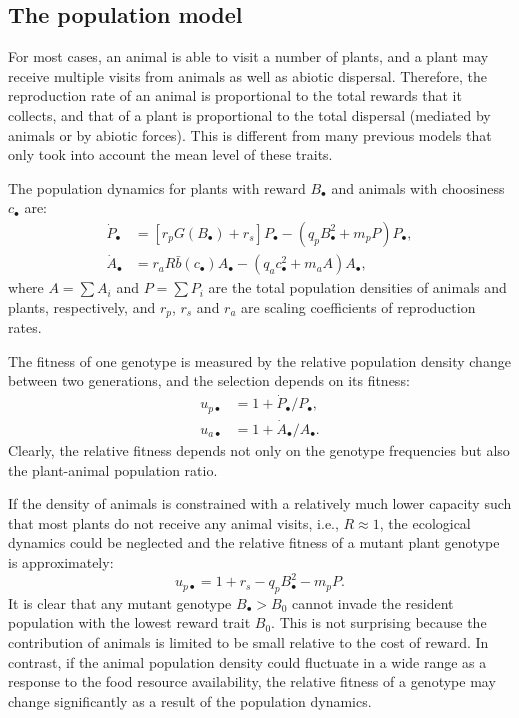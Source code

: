 \documentclass[12pt]{article}
\begin{document}
\subsection*{The population model}

For most cases, an animal is able to visit a number of plants, and a plant may receive multiple visits from animals as well as abiotic dispersal. Therefore, the reproduction rate of an animal is proportional to the total rewards that it collects, and that of a plant is proportional to the total dispersal (mediated by animals or by abiotic forces). This is different from many previous models that only took into account the mean level of these traits.

The population dynamics for plants with reward $B_\bullet$ and animals with choosiness $c_\bullet$ are:
\begin{subequations}
\begin{align}
\label{eq:PlantDensity}
\dot{P}_\bullet &= \left[r_p G(B_\bullet)+r_s \right] P_\bullet - (q_p B^2_\bullet + m_p P) P_\bullet , \\
\label{eq:AnimalDensity}
\dot{A}_\bullet&=r_a R \bar{b}(c_\bullet) A_\bullet- (q_a c^2_\bullet + m_a A) A_\bullet  , 
\end{align}
\end{subequations}
where $A=\sum{A_i}$ and $P=\sum{P_i}$ are the total population densities of animals and plants, respectively, and $r_p$, $r_s$ and $r_a$ are scaling coefficients of reproduction rates. 

The fitness of one genotype is measured by the relative population density change between two generations, and the selection depends on its fitness:
\begin{align*}
u_{p\bullet} &= 1+ \dot{P}_\bullet / P_\bullet, \\
u_{a\bullet} &= 1+ \dot{A}_\bullet / A_\bullet.
\label{eq:fitness}
\end{align*}
Clearly, the relative fitness depends not only on the genotype frequencies but also the plant-animal population ratio.

If the density of animals is constrained with a relatively much lower capacity such that most plants do not receive any animal visits, i.e., $R \approx 1$, the ecological dynamics could be neglected and the relative fitness of a mutant plant genotype is approximately:  
\begin{equation*}
u_{p\bullet}=1+ r_s - q_p B^2_\bullet - m_p P.
\end{equation*}
It is clear that any mutant genotype $B_\bullet>B_0$ cannot invade the resident population with the lowest reward trait $B_0$. This is not surprising because the contribution of animals is limited to be small relative to the cost of reward. In contrast, if the animal population density could fluctuate in a wide range as a response to the food resource availability, the relative fitness of a genotype may change significantly as a result of the population dynamics.
\end{document}
